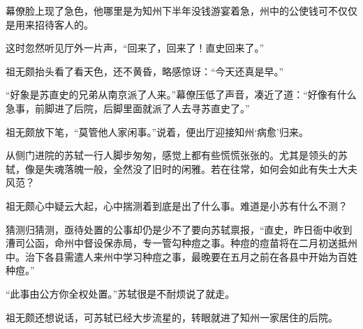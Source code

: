 幕僚脸上现了急色，他哪里是为知州下半年没钱游宴着急，州中的公使钱可不仅仅是用来招待客人的。

这时忽然听见厅外一片声，“回来了，回来了！直史回来了。”

祖无颇抬头看了看天色，还不黄昏，略感惊讶：“今天还真是早。”

“好象是苏直史的兄弟从南京派了人来。”幕僚压低了声音，凑近了道：“好像有什么急事，前脚进了后院，后脚里面就派了人去寻苏直史了。”

祖无颇放下笔，“莫管他人家闲事。”说着，便出厅迎接知州‘病愈’归来。

从侧门进院的苏轼一行人脚步匆匆，感觉上都有些慌慌张张的。尤其是领头的苏轼，像是失魂落魄一般，全然没了旧时的闲雅。若在往常，如何会如此有失士大夫风范？

祖无颇心中疑云大起，心中揣测着到底是出了什么事。难道是小苏有什么不测？

猜测归猜测，亟待处置的公事却仍是少不了要向苏轼禀报，“直史，昨日衙中收到漕司公函，命州中督设保赤局，专一管勾种痘之事。种痘的痘苗将在二月初送抵州中。治下各县需遣人来州中学习种痘之事，最晚要在五月之前在各县中开始为百姓种痘。”

“此事由公方你全权处置。”苏轼很是不耐烦说了就走。

祖无颇还想说话，可苏轼已经大步流星的，转眼就进了知州一家居住的后院。

